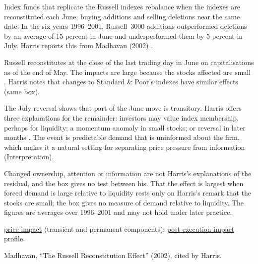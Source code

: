 \begin{qfevidence}\label{ev:index-reconstitution-impact}
 Index funds that replicate the Russell indexes rebalance when the indexes are reconstituted each June, buying additions and selling deletions near the same date. In the six years 1996--2001, Russell~3000 additions outperformed deletions by an average of 15 percent in June and underperformed them by 5 percent in July. Harris reports this from Madhavan (2002) \citep[chap.~``Index and Portfolio Markets'', box, p.~487]{alpha-harris}.

 Russell reconstitutes at the close of the last trading day in June on capitalisations as of the end of May. The impacts are large because the stocks affected are small \citep[same box]{alpha-harris}. Harris notes that changes to Standard \& Poor's indexes have similar effects (same box).

 The July reversal shows that part of the June move is transitory. Harris offers three explanations for the remainder: investors may value index membership, perhaps for liquidity; a momentum anomaly in small stocks; or reversal in later months \citep[same box]{alpha-harris}. The event is predictable demand that is uninformed about the firm, which makes it a natural setting for separating price pressure from information (Interpretation).

 Changed ownership, attention or information are not Harris's explanations of the residual, and the box gives no test between his. That the effect is largest when forced demand is large relative to liquidity rests only on Harris's remark that the stocks are small; the box gives no measure of demand relative to liquidity. The figures are averages over 1996--2001 and may not hold under later practice.

 \hyperref[def:price-impact]{price impact} (transient and permanent components); \hyperref[meth:post-execution-impact-profile]{post-execution impact profile}.

 Madhavan, ``The Russell Reconstitution Effect'' (2002), cited by Harris.

\end{qfevidence}
